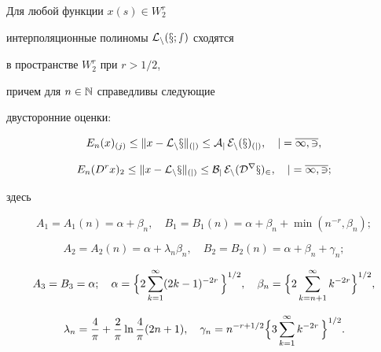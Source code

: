 \begin{thm} Для любой функции $x(s)\in W_2^r$


интерполяционные полиномы $\cal {L}_n(x;s)$ сходятся


в пространстве $W_2^r$ при $r>1/2$,


причем для $n\in \Bbb{N}$ справедливы следующие


двусторонние оценки:


\begin{equation}


E_n(x)_{(j)}\le \|x-\cal L_nx\|_{(j)}\le


A_j\, E_n(x)_{(j)},\quad j=\overline{1,3},


\end{equation}


%


\begin{equation}


E_n(D^rx)_2\le \|x -\cal L_nx\|_{(j)}\le


B_j\, E_n(D^rx)_2,\quad j=\overline{1,3};


\end{equation}


здесь


$$


A_1=A_1(n)=\alpha +\beta_n,\quad B_1=B_1(n)=\alpha + \beta_n


+ \min (n^{-r}, \beta_n);


$$


$$


A_2=A_2(n)=\alpha +\lambda_n\beta_n,\quad


B_2=B_2(n)=\alpha +\beta_n +\gamma_n ;


$$


$$


A_3=B_3=\alpha ;\quad


\alpha =\Bigl\{ 2 \sum_{k=1}^\infty (2k-1)^{-2r}\, \Bigr\}^{1/2},\quad


\beta_n =\Bigl\{ 2 \sum_{k=n+1}^\infty k^{-2r} \Bigr\}^{1/2},


$$


$$


\lambda_n=\frac{4}{\pi} +


\frac{2}{\pi}\ln {\frac{4}{\pi}(2n+1)},\quad


\gamma_n= n^{-r+1/2} \Bigl\{ 3\sum_{k=1}^\infty k^{-2r}\, \Bigr\}^{1/2}.


$$


\end{thm}





